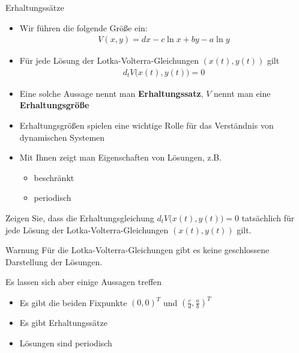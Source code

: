 \begin{frame}{Erhaltungssätze}
  \begin{itemize}
  \item Wir führen die folgende Größe ein:
    \begin{gather*}
      V(x,y) = dx - c \ln x + by - a \ln y
    \end{gather*}
  \item Für jede Lösung der Lotka-Volterra-Gleichungen $(x(t),y(t))$ gilt
    \begin{gather*}
      d_t V\bigl(x(t),y(t)\bigr) = 0
    \end{gather*}
    \pause
  \item Eine solche Aussage nennt man \textbf{Erhaltungssatz}, $V$
    nennt man eine \textbf{Erhaltungsgröße}
  \item Erhaltungsgrößen spielen eine wichtige Rolle für das
    Verständnis von dynamischen Systemen
  \item Mit Ihnen zeigt man Eigenschaften von Lösungen, z.B.
    \begin{itemize}
    \item beschränkt
    \item periodisch
    \end{itemize}
  \end{itemize}
  
\end{frame}

\begin{Aufgabe}
  Zeigen Sie, dass die Erhaltungsgleichung
  $d_t V\bigl(x(t),y(t)\bigr) = 0$ tatsächlich für jede Lösung der Lotka-Volterra-Gleichungen $(x(t),y(t))$ gilt.
\end{Aufgabe}

\begin{frame}
  \begin{block}{Warnung}
    Für die Lotka-Volterra-Gleichungen gibt es keine geschlossene
    Darstellung der Lösungen.
  \end{block}

  Es lassen sich aber einige Aussagen treffen
  \begin{itemize}
  \item Es gibt die beiden Fixpunkte $(0,0)^T$ und
    $\left(\tfrac cd,\tfrac ab\right)^T$
  \item Es gibt Erhaltungssätze
  \item Lösungen sind periodisch
  \end{itemize}
\end{frame}

